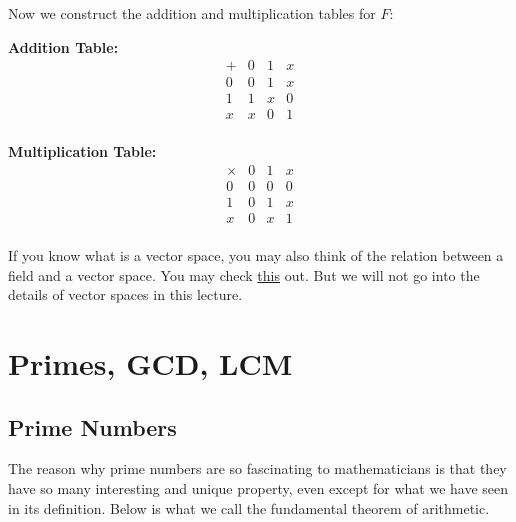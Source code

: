 \documentclass[oneside]{book}
\begin{document}
{	Now we construct the addition and multiplication tables for \( F \):
	\bigbreak
	\noindent
	\begin{minipage}{.5\textwidth}
		\centering
		\textbf{Addition Table:}
		\[
			\begin{array}{c|ccc}
				+ & 0 & 1 & x \\
				\hline
				0 & 0 & 1 & x \\
				1 & 1 & x & 0 \\
				x & x & 0 & 1 \\
			\end{array}
		\]
	\end{minipage}%
	\begin{minipage}{.5\textwidth}
		\centering
		\textbf{Multiplication Table:}
		\[
			\begin{array}{c|ccc}
				\times & 0 & 1 & x \\
				\hline
				0      & 0 & 0 & 0 \\
				1      & 0 & 1 & x \\
				x      & 0 & x & 1 \\
			\end{array}
		\]
	\end{minipage}
}

If you know what is a vector space, you may also think of the relation between a field and a vector space. You may check \href{https://math.arizona.edu/~cais/223Page/hout/236w06fields.pdf}{this} out. But we will not go into the details of vector spaces in this lecture.

\chapter{Primes, GCD, LCM}

\section{Prime Numbers}


The reason why prime numbers are so fascinating to mathematicians is that they have so many interesting and unique property, even except for what we have seen in its definition. Below is what we call the fundamental theorem of arithmetic.
\end{document}
